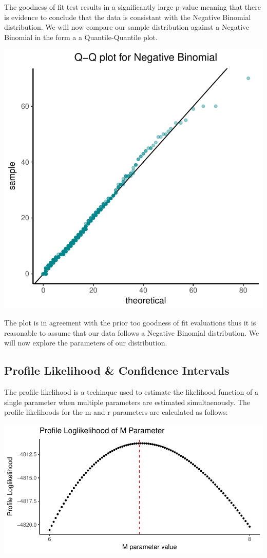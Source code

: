 \documentclass[11pt,preprint, authoryear]{elsarticle}
\numberwithin{equation}{section}
\numberwithin{figure}{section}
\numberwithin{table}{section}
\begin{document}
The goodness of fit test results in a significantly large p-value
meaning that there is evidence to conclude that the data is consistant
with the Negative Binomial distribution. We will now compare our sample
distribution against a Negative Binomial in the form a a
Quantile-Quantile plot.

\includegraphics{likelihood_files/figure-latex/qq_plot-1.pdf}

The plot is in agreement with the prior too goodness of fit evaluations
thus it is reasonable to assume that our data follows a Negative
Binomial distribution. We will now explore the parameters of our
distribution.

\newpage 

\subsection{Profile Likelihood \& Confidence
Intervals}\label{profile-likelihood-confidence-intervals}

The profile likelihood is a techinque used to estimate the likelihood
function of a single parameter when multiple parameters are estimated
simultaenously. The profile likelihoods for the m and r parameters are
calculated as follows:

\includegraphics{likelihood_files/figure-latex/profile_likelihood_m-1.pdf}
\end{document}
